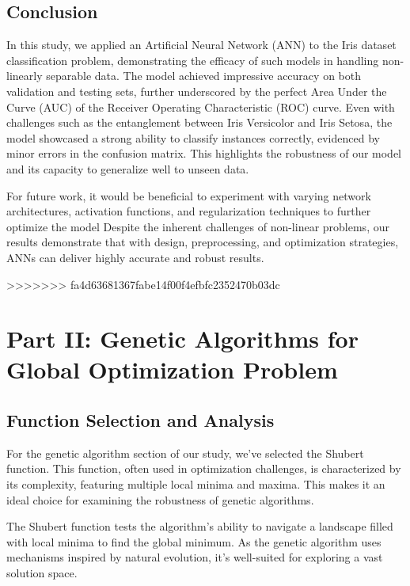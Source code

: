 \documentclass[conference]{inc/IEEEtran}
\begin{document}
\subsection{Conclusion}

In this study, we applied an Artificial Neural Network (ANN) to the Iris dataset classification problem, demonstrating the efficacy of such models in handling non-linearly separable data. The model achieved impressive accuracy on both validation and testing sets, further underscored by the perfect Area Under the Curve (AUC) of the Receiver Operating Characteristic (ROC) curve. Even with challenges such as the entanglement between Iris Versicolor and Iris Setosa, the model showcased a strong ability to classify instances correctly, evidenced by minor errors in the confusion matrix. This highlights the robustness of our model and its capacity to generalize well to unseen data.

For future work, it would be beneficial to experiment with varying network architectures, activation functions, and regularization techniques to further optimize the model Despite the inherent challenges of non-linear problems, our results demonstrate that with design, preprocessing, and optimization strategies, ANNs can deliver highly accurate and robust results.

>>>>>>> fa4d63681367fabe14f00f4efbfc2352470b03dc

\section{Part II: Genetic Algorithms for Global Optimization Problem}

\subsection{Function Selection and Analysis}

For the genetic algorithm section of our study, we've selected the Shubert function. This function, often used in optimization challenges, is characterized
by its complexity, featuring multiple local minima and maxima. This makes it an ideal choice for examining the robustness of genetic algorithms.

The Shubert function tests the algorithm's ability to navigate a landscape filled with local minima to find the global minimum. As the genetic algorithm
uses mechanisms inspired by natural evolution, it's well-suited for exploring a vast solution space.
\end{document}
